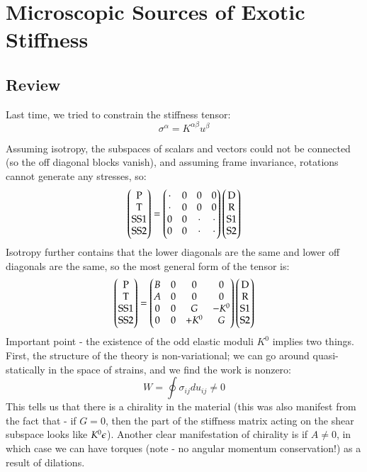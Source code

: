 \section{Microscopic Sources of Exotic Stiffness}

\subsection{Review}
Last time, we tried to constrain the stiffness tensor:
\begin{equation}
    \sigma^\alpha = K^{\alpha\beta}u^\beta
\end{equation}

Assuming isotropy, the subspaces of scalars and vectors could not be connected (so the off diagonal blocks vanish), and assuming frame invariance, rotations cannot generate any stresses, so:
\begin{equation}
    \begin{pmatrix}\text{P} \\ \text{T} \\ \text{SS1} \\ \text{SS2}\end{pmatrix} = \begin{pmatrix}\cdot & 0 & 0 & 0 \\ \cdot & 0 & 0 & 0 \\ 0 & 0 & \cdot & \cdot \\ 0 & 0 & \cdot & \cdot\end{pmatrix}\begin{pmatrix}\text{D} \\ \text{R} \\ \text{S1} \\ \text{S2}\end{pmatrix}
\end{equation}
Isotropy further contains that the lower diagonals are the same and lower off diagonals are the same, so the most general form of the tensor is:
\begin{equation}\label{eq:macroscopic}
    \begin{pmatrix}\text{P} \\ \text{T} \\ \text{SS1} \\ \text{SS2}\end{pmatrix} = \begin{pmatrix}B & 0 & 0 & 0 \\ A & 0 & 0 & 0 \\ 0 & 0 & G & -K^0 \\ 0 & 0 & +K^0 & G\end{pmatrix}\begin{pmatrix}\text{D} \\ \text{R} \\ \text{S1} \\ \text{S2}\end{pmatrix}
\end{equation}
Important point - the existence of the odd elastic moduli $K^0$ implies two things. First, the structure of the theory is non-variational; we can go around quasi-statically in the space of strains, and we find the work is nonzero:
\begin{equation}
    W = \oint \sigma_{ij}du_{ij}\neq 0
\end{equation}
This tells us that there is a chirality in the material (this was also manifest from the fact that - if $G = 0$, then the part of the stiffness matrix acting on the shear subspace looks like $K^0\epsilon$). Another clear manifestation of chirality is if $A \neq 0$, in which case we can have torques (note - no angular momentum conservation!) as a result of dilations.

